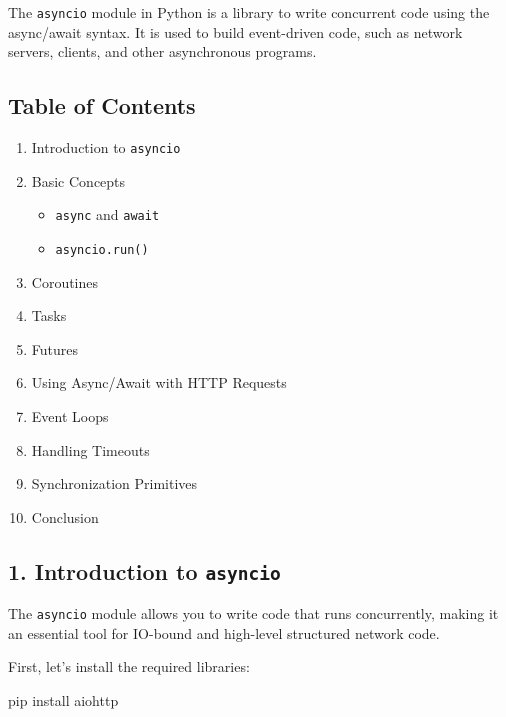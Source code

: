 \documentclass[
  letterpaper,
  DIV=11,
  numbers=noendperiod]{scrreprt}
\newenvironment{Shaded}{\begin{snugshade}}{\end{snugshade}}
\newcommand{\ExtensionTok}[1]{\textcolor[rgb]{0.00,0.23,0.31}{#1}}
\newcommand{\NormalTok}[1]{\textcolor[rgb]{0.00,0.23,0.31}{#1}}
\providecommand{\tightlist}{%
  \setlength{\itemsep}{0pt}\setlength{\parskip}{0pt}}\usepackage{longtable,booktabs,array}
\begin{document}
The \texttt{asyncio} module in Python is a library to write concurrent
code using the async/await syntax. It is used to build event-driven
code, such as network servers, clients, and other asynchronous programs.

\subsection{Table of Contents}\label{table-of-contents-12}

\begin{enumerate}
\def\labelenumi{\arabic{enumi}.}
\tightlist
\item
  Introduction to \texttt{asyncio}
\item
  Basic Concepts

  \begin{itemize}
  \tightlist
  \item
    \texttt{async} and \texttt{await}
  \item
    \texttt{asyncio.run()}
  \end{itemize}
\item
  Coroutines
\item
  Tasks
\item
  Futures
\item
  Using Async/Await with HTTP Requests
\item
  Event Loops
\item
  Handling Timeouts
\item
  Synchronization Primitives
\item
  Conclusion
\end{enumerate}

\subsection{\texorpdfstring{1. Introduction to
\texttt{asyncio}}{1. Introduction to asyncio}}\label{introduction-to-asyncio}

The \texttt{asyncio} module allows you to write code that runs
concurrently, making it an essential tool for IO-bound and high-level
structured network code.

First, let's install the required libraries:

\begin{Shaded}
\begin{Highlighting}[]
\ExtensionTok{pip}\NormalTok{ install aiohttp}
\end{Highlighting}
\end{Shaded}
\end{document}

